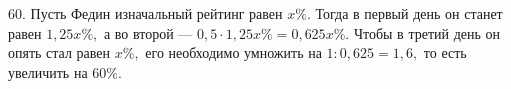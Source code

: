 60. Пусть Федин изначальный рейтинг равен $x\%.$ Тогда в первый день он станет равен $1,25x\%,$ а во второй --- $0,5\cdot1,25x\%=0,625x\%.$ Чтобы в третий день он опять стал равен $x\%,$ его необходимо умножить на $1:0,625=1,6,$ то есть увеличить на $60\%.$\\
